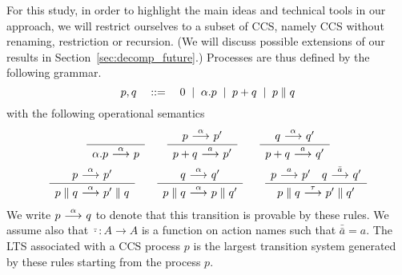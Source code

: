 For this study, 
in order to highlight the main ideas and technical tools in our approach,
we will restrict ourselves to a subset of CCS, namely CCS without
renaming, restriction or recursion. 
(We will discuss possible extensions of our results in 
Section~\ref{sec:decomp_future}.)
Processes are thus defined by the following
grammar.
\[
    p,q \quad::=\quad 0 \;\;|\;\; \alpha.p \;\;|\;\; p + q \;\;|\;\; p \parallel q
\]
with the following operational semantics
\begin{gather*}
    \sosrule{}{\alpha.p \trans{\alpha} p} \qquad
    \sosrule{p\trans{\alpha}p'}{p + q \trans{a} p'} \qquad
    \sosrule{q\trans{\alpha}q'}{p + q \trans{a} q'} \\
    \sosrule{p\trans{\alpha}p'}{p \parallel q \trans{\alpha} p' \parallel q} \qquad
    \sosrule{q\trans{\alpha}q'}{p \parallel q \trans{\alpha} p \parallel q'} \qquad
    \sosrule{p\trans{a}p'\quad q\trans{\bar{a}}q'}{p \parallel q \trans{\tau} p' \parallel q'}
\end{gather*}
We write $p\ {\stackrel{{\alpha}}{\longrightarrow}}\ q$ to denote that this transition is provable by
these rules. We assume also that $\bar{\cdot} : A\rightarrow A$ is a function on action names
such that $\bar{\bar{a}} = a$.
The LTS associated with a CCS process $p$ is the largest transition system 
generated by these
rules starting from the process $p$. 

